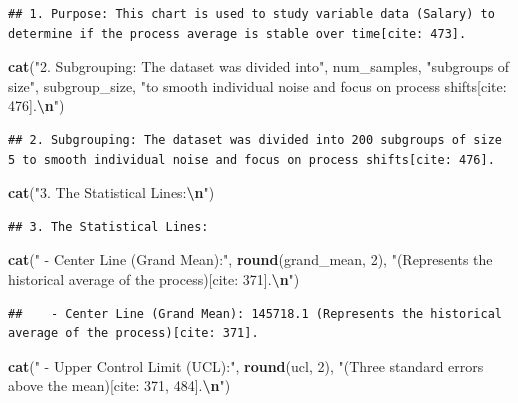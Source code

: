 \documentclass[
]{article}
\newenvironment{Shaded}{\begin{snugshade}}{\end{snugshade}}
\newcommand{\DecValTok}[1]{\textcolor[rgb]{0.00,0.00,0.81}{#1}}
\newcommand{\FunctionTok}[1]{\textcolor[rgb]{0.13,0.29,0.53}{\textbf{#1}}}
\newcommand{\NormalTok}[1]{#1}
\newcommand{\SpecialCharTok}[1]{\textcolor[rgb]{0.81,0.36,0.00}{\textbf{#1}}}
\newcommand{\StringTok}[1]{\textcolor[rgb]{0.31,0.60,0.02}{#1}}
\begin{document}
\begin{verbatim}
## 1. Purpose: This chart is used to study variable data (Salary) to determine if the process average is stable over time[cite: 473].
\end{verbatim}

\begin{Shaded}
\begin{Highlighting}[]
\FunctionTok{cat}\NormalTok{(}\StringTok{"2. Subgrouping: The dataset was divided into"}\NormalTok{, num\_samples, }\StringTok{"subgroups of size"}\NormalTok{, subgroup\_size, }\StringTok{"to smooth individual noise and focus on process shifts[cite: 476].}\SpecialCharTok{\textbackslash{}n}\StringTok{"}\NormalTok{)}
\end{Highlighting}
\end{Shaded}

\begin{verbatim}
## 2. Subgrouping: The dataset was divided into 200 subgroups of size 5 to smooth individual noise and focus on process shifts[cite: 476].
\end{verbatim}

\begin{Shaded}
\begin{Highlighting}[]
\FunctionTok{cat}\NormalTok{(}\StringTok{"3. The Statistical Lines:}\SpecialCharTok{\textbackslash{}n}\StringTok{"}\NormalTok{)}
\end{Highlighting}
\end{Shaded}

\begin{verbatim}
## 3. The Statistical Lines:
\end{verbatim}

\begin{Shaded}
\begin{Highlighting}[]
\FunctionTok{cat}\NormalTok{(}\StringTok{"   {-} Center Line (Grand Mean):"}\NormalTok{, }\FunctionTok{round}\NormalTok{(grand\_mean, }\DecValTok{2}\NormalTok{), }\StringTok{"(Represents the historical average of the process)[cite: 371].}\SpecialCharTok{\textbackslash{}n}\StringTok{"}\NormalTok{)}
\end{Highlighting}
\end{Shaded}

\begin{verbatim}
##    - Center Line (Grand Mean): 145718.1 (Represents the historical average of the process)[cite: 371].
\end{verbatim}

\begin{Shaded}
\begin{Highlighting}[]
\FunctionTok{cat}\NormalTok{(}\StringTok{"   {-} Upper Control Limit (UCL):"}\NormalTok{, }\FunctionTok{round}\NormalTok{(ucl, }\DecValTok{2}\NormalTok{), }\StringTok{"(Three standard errors above the mean)[cite: 371, 484].}\SpecialCharTok{\textbackslash{}n}\StringTok{"}\NormalTok{)}
\end{Highlighting}
\end{Shaded}
\end{document}
